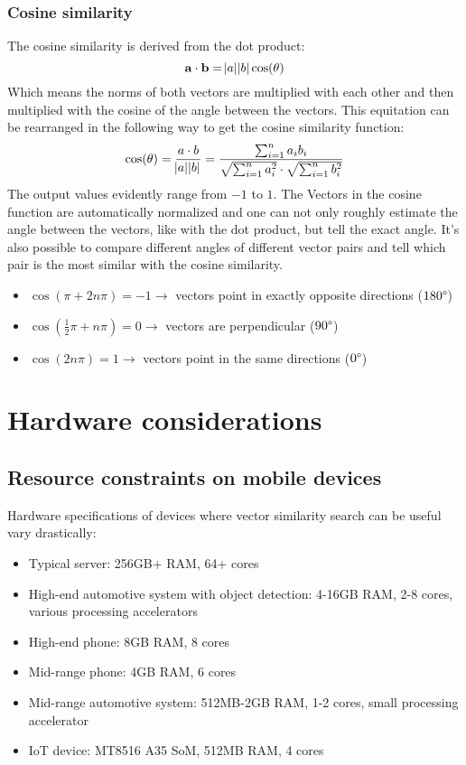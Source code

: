 \subsubsection{Cosine similarity}
\label{sec:cosinetodot}
The cosine similarity is derived from the dot product:
$$\mathbf{a} \cdot \mathbf{b} = \abs{a} \abs{b} \cos(\theta) $$
Which means the norms of both vectors are multiplied with each other
and then multiplied with the cosine of the angle between the vectors.
This equitation can be rearranged in the following way to get the cosine similarity function:
$$\cos(\theta) = \frac{a \cdot b}{\abs{a} \abs{b}} = \frac{\sum_{i=1}^n a_i b_i}{\sqrt{\sum_{i=1}^n a_i^2} \cdot \sqrt{\sum_{i=1}^n b_i^2}}$$
The output values evidently range from $-1$ to $1$.
The Vectors in the cosine function are automatically normalized and one can not only roughly estimate the angle between the vectors,
like with the dot product, but tell the exact angle.
It's also possible to compare different angles of different vector pairs and tell which pair is the most similar
with the cosine similarity.
\begin{itemize}
    \item $\cos(\pi + 2n \pi) = -1$$\rightarrow$ vectors point in exactly opposite directions ($180\degree$)
    \item $\cos(\frac{1}{2} \pi + n \pi) = 0$$\rightarrow$ vectors are perpendicular ($90\degree$)
    \item $\cos(2n\pi) = 1$$\rightarrow$ vectors point in the same directions ($0\degree$)
\end{itemize}


\section{Hardware considerations}
\subsection{Resource constraints on mobile devices}
Hardware specifications of devices where vector similarity search can be useful vary drastically:
\begin{itemize}
    \item Typical server: 256GB+ RAM, 64+ cores
    \item High-end automotive system with object detection: 4-16GB RAM, 2-8 cores, various processing accelerators
    \item High-end phone: 8GB RAM, 8 cores
    \item Mid-range phone: 4GB RAM, 6 cores
    \item Mid-range automotive system: 512MB-2GB RAM, 1-2 cores, small processing accelerator
    \item IoT device: MT8516 A35 SoM, 512MB RAM, 4 cores
\end{itemize}
